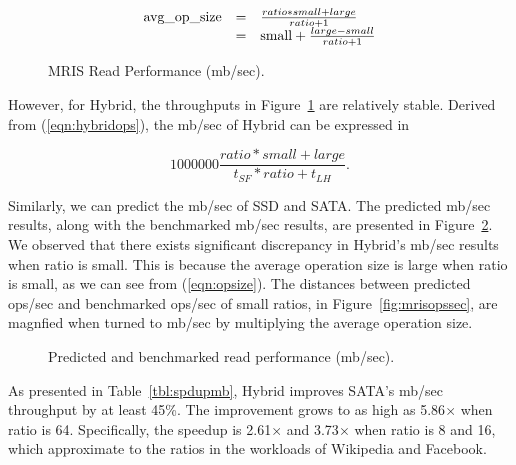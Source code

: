 \begin{equation}
\label{eqn:opsize}
\begin{array}{r@{\quad=\quad}l}
  \mbox{avg\_op\_size} & \frac{ratio * small + large}{ratio + 1} \\
   & \mbox{small} + \frac{large - small}{ratio + 1} 
\end{array}
\end{equation}

\begin{figure}[t]
\begin{centering}
\caption{MRIS Read Performance (mb/sec).}
\label{fig:mrismbsec}
\end{centering}
\end{figure}

However, for Hybrid, the throughputs in Figure~\ref{fig:mrismbsec} are
relatively stable. Derived from (\ref{eqn:hybridops}), the mb/sec of
Hybrid can be expressed in

\begin{equation}
\label{eqn:hybridthput}
    1000000 \frac{ratio * small + large}{t_{SF} * ratio + t_{LH}} .
\end{equation}

Similarly, we can predict the mb/sec of SSD and SATA. The predicted
mb/sec results, along with the benchmarked mb/sec results, are
presented in Figure~\ref{fig:thputpred}. We observed that there exists
significant discrepancy in Hybrid's mb/sec results when ratio is
small. This is because the average operation size is large when ratio
is small, as we can see from (\ref{eqn:opsize}). The distances between
predicted ops/sec and benchmarked ops/sec of small ratios, in
Figure~\ref{fig:mrisopssec}, are magnfied when turned to mb/sec by
multiplying the average operation size.

\begin{figure}[t]
\begin{centering}
\caption{Predicted and benchmarked read performance (mb/sec).}
\label{fig:thputpred}
\end{centering}
\end{figure}

As presented in Table~\ref{tbl:spdupmb}, Hybrid improves SATA's mb/sec
throughput by at least 45\%. The improvement grows to as high as
5.86$\times$ when ratio is 64.  Specifically, the speedup is
2.61$\times$ and 3.73$\times$ when ratio is 8 and 16, which
approximate to the ratios in the workloads of Wikipedia and Facebook.

